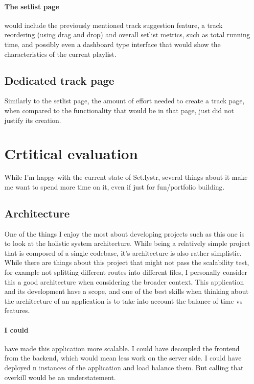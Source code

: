 \documentclass[10pt, a4paper]{article}
\begin{document}
	\paragraph{The setlist page} would include the previously mentioned track suggestion feature, a track reordering (using drag and drop) and overall setlist metrics, such as total running time, and possibly even a dashboard type interface that would show the characteristics of the current playlist.
	
	\subsection{Dedicated track page}
	Similarly to the setlist page, the amount of effort needed to create a track page, when compared to the functionality that would be in that page, just did not justify its creation. 
	
\section{Crtitical evaluation}
	While I'm happy with the current state of Set.lystr, several things about it make me want to spend more time on it, even if just for fun/portfolio building.

	\subsection{Architecture}
	One of the things I enjoy the most about developing projects such as this one is to look at the holistic  system architecture. While being a relatively simple project that is composed of a single codebase, it's architecture is also rather simplistic. While there are things about this project that might not pass the scalability test, for example not splitting different routes into different files, I personally consider this a good architecture when considering the broader context. This application and its development have a scope, and one of the best skills when thinking about the architecture of an application is to take into account the balance of time vs features.
	\paragraph{I could} have made this application more scalable. I could have decoupled the frontend from the backend, which would mean less work on the server side. I could have deployed n instances of the application and load balance them. But calling that overkill would be an understatement.
\end{document}
